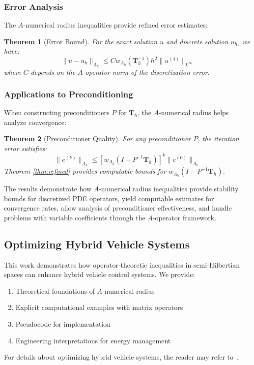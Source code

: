 \documentclass{article}
\newtheorem{theorem}{Theorem}[section]
\begin{document}
\subsubsection{Error Analysis}
The $A$-numerical radius inequalities provide refined error estimates:

\begin{theorem}[Error Bound]
For the exact solution $u$ and discrete solution $u_h$, we have:
\[
\|u - u_h\|_{A_h} \leq C w_{A_h}(\mathbf{T}_h^{-1})h^2\|u^{(4)}\|_{L^\infty}
\]
where $C$ depends on the $A$-operator norm of the discretization error.
\end{theorem}

\subsubsection{Applications to Preconditioning}
When constructing preconditioners $P$ for $\mathbf{T}_h$, the $A$-numerical radius helps analyze convergence:
\begin{theorem}[Preconditioner Quality]
For any preconditioner $P$, the iteration error satisfies:
\[
\|e^{(k)}\|_{A_h} \leq [w_{A_h}(I - P^{-1}\mathbf{T}_h)]^k \|e^{(0)}\|_{A_h}
\]
Theorem \ref{thm:refined} provides computable bounds for $w_{A_h}(I - P^{-1}\mathbf{T}_h)$.
\end{theorem}
The results demonstrate how $A$-numerical radius inequalities provide stability bounds for discretized PDE operators, yield computable estimates for convergence rates, allow analysis of preconditioner effectiveness, and handle problems with variable coefficients through the $A$-operator framework.
\subsection{Optimizing Hybrid Vehicle Systems}\hfill

This work demonstrates how operator-theoretic inequalities in semi-Hilbertian spaces can enhance hybrid vehicle control systems. We provide:
\begin{enumerate}
    \item Theoretical foundations of $A$-numerical radius
    \item Explicit computational examples with matrix operators
    \item Pseudocode for implementation
    \item Engineering interpretations for energy management
\end{enumerate}
For details about optimizing hybrid vehicle systems, the reader may refer to~\cite{control}.
\end{document}
